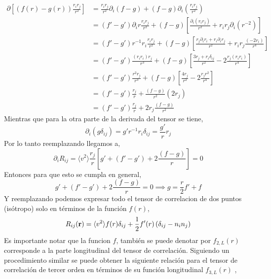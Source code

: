 \documentclass[executivepaper,12pt]{article}
\numberwithin{equation}{section}
\begin{document}
\begin{align*}
	\partial\left[(f(r)- g(r))\frac{r_i r_j}{r^2}\right]&=\frac{r_ir_j}{r^2}\partial_i(f-g)+(f-g)\partial_i\left(\frac{r_ir_j}{r^2}\right)\\
	&=(f'-g')\partial_ir\frac{r_i r_j}{r^2}+(f-g)\left[\frac{\partial_i(r_ir_j)}{r^2}+r_ir_j\partial_i(r^{-2})\right]\\
	&=(f'-g')r^{-1}r_i\frac{r_i r_j}{r^2}+(f-g)\left[\frac{r_j\partial_i r_i+r_i\partial_ir_j}{r^2}+r_ir_j\frac{(-2r_i)}{r^4}\right]\\
	&=(f'-g')\frac{(r_ir_i) r_j}{r^3}+(f-g)\left[\frac{3r_j+r_i\delta_{ij}}{r^2}-2\frac{r_j(r_ir_i)}{r^4}\right]\\
	&=(f'-g')\frac{r^2 r_j}{r^3}+(f-g)\left[\frac{4r_j}{r^2}-2\frac{r_jr^2}{r^4}\right]\\
	&=(f'-g')\frac{ r_j}{r}+\frac{(f-g)}{r^2}(2r_j)\\
	&=(f'-g')\frac{ r_j}{r}+2r_j\frac{(f-g)}{r^2}
\end{align*}
Mientras que para la otra parte de la derivada del tensor se tiene,
\begin{equation*}
	\partial_i(g\delta_{ij})=g'r^{-1}r_i\delta_{ij}=\frac{g'}{r}r_j
\end{equation*}
Por lo tanto reemplazando llegamos a,
\begin{equation*}
	\partial_{i} R_{ij}=\langle v^2 \rangle \frac{r_j}{r}\left[g'+(f'-g') +2\frac{(f-g)}{r}\right]=0
\end{equation*}
Entonces para que esto se cumpla en general,
\begin{equation*}
	g'+(f'-g') +2\frac{(f-g)}{r}=0\implies g=\frac{r}{2}f'+f 
\end{equation*}
Y reemplazando podemos expresar todo el tensor de correlacion de dos puntos (isótropo) solo en términos de la función $f(r)$,
\begin{equation}
	R_{ij}(\vb{r})=\langle v^2 \rangle f(r) \delta_{ij}+\frac{1}{2}f'(r)\left(\delta_{ij}-n_in_j\right) \label{eq.corr2}
\end{equation}
Es importante notar que la funcion $f$, también se puede denotar por $f_{2,L}(r)$ corresponde a la parte longitudinal del tensor de correlación. Siguiendo un procedimiento similar se puede obtener la siguiente relación para el tensor de correlación de tercer orden en términos de su función longitudinal $f_{3,L}(r)$ \parencite{friedrich2020},
\end{document}
